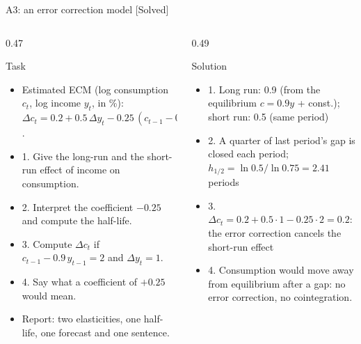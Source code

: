 \begin{frame}{A3: an error correction model [Solved]}
\itemsize{\scriptsize}
\begin{columns}[T]
\begin{column}{0.47\textwidth}
\begin{block}{Task}
\begin{itemize}
    \item Estimated ECM (log consumption $c_t$, log income $y_t$, in \%): $\Delta c_t = 0.2 + 0.5\,\Delta y_t - 0.25\,(c_{t-1} - 0.9\,y_{t-1})$.
    \item 1. Give the long-run and the short-run effect of income on consumption.
    \item 2. Interpret the coefficient $-0.25$ and compute the half-life.
    \item 3. Compute $\Delta c_t$ if $c_{t-1} - 0.9\,y_{t-1} = 2$ and $\Delta y_t = 1$.
    \item 4. Say what a coefficient of $+0.25$ would mean.
    \item Report: two elasticities, one half-life, one forecast and one sentence.
\end{itemize}
\end{block}
\end{column}
\begin{column}{0.49\textwidth}
\begin{exampleblock}{Solution}
\begin{itemize}
    \item 1. Long run: 0.9 (from the equilibrium $c = 0.9y$ + const.); short run: 0.5 (same period)
    \item 2. A quarter of last period's gap is closed each period; $h_{1/2} = \ln 0.5/\ln 0.75 = 2.41$ periods
    \item 3. $\Delta c_t = 0.2 + 0.5 \cdot 1 - 0.25 \cdot 2 = 0.2$: the error correction cancels the short-run effect
    \item 4. Consumption would move away from equilibrium after a gap: no error correction, no cointegration.
\end{itemize}
\end{exampleblock}
\end{column}
\end{columns}
\end{frame}

